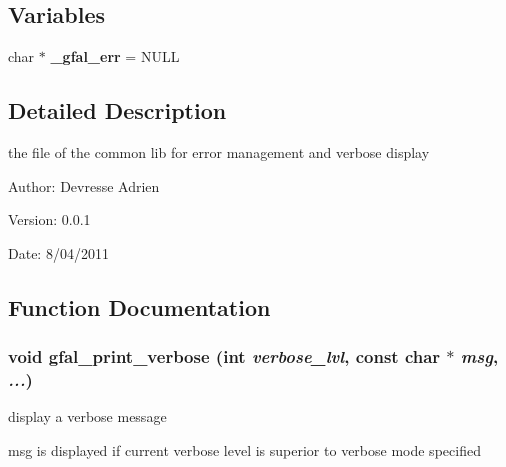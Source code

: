 \subsection*{Variables}
\begin{CompactItemize}
\item 
char $\ast$ \textbf{\_\-gfal\_\-err} = NULL\label{gfal__common__errverbose_8c_edaf93b87fe65f43cf349705f1ce6e59}

\end{CompactItemize}


\subsection{Detailed Description}
the file of the common lib for error management and verbose display 

\begin{Desc}
\item[Author:]Devresse Adrien \end{Desc}
\begin{Desc}
\item[Version:]0.0.1 \end{Desc}
\begin{Desc}
\item[Date:]8/04/2011 \end{Desc}


\subsection{Function Documentation}
\subsubsection{\setlength{\rightskip}{0pt plus 5cm}void gfal\_\-print\_\-verbose (int {\em verbose\_\-lvl}, const char $\ast$ {\em msg},  {\em ...})}\label{gfal__common__errverbose_8c_8b05640b4b43a776603bd93703c29d30}


display a verbose message 

msg is displayed if current verbose level is superior to verbose mode specified 
